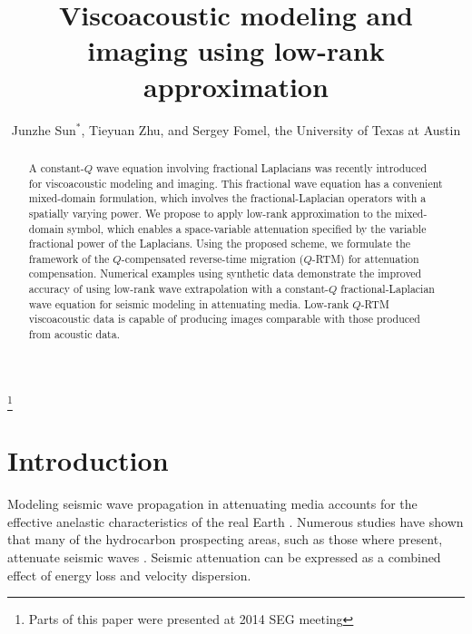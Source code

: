 \title{Viscoacoustic modeling and imaging using low-rank approximation}
\author{Junzhe Sun$^{*}$, Tieyuan Zhu, and Sergey Fomel, the University of Texas at Austin}
\maketitle

\address{
\footnotemark[1]Bureau of Economic Geology \\
John A. and Katherine G. Jackson School of Geosciences \\
The University of Texas at Austin \\
University Station, Box X \\
Austin, TX 78713-8924 \\
}

\footnote{Parts of this paper were presented at 2014 SEG meeting}


\begin{abstract}
A constant-$Q$ wave equation involving fractional Laplacians was recently introduced for viscoacoustic modeling and imaging. This fractional wave equation has a convenient mixed-domain formulation, which involves the fractional-Laplacian operators with a spatially varying power. We propose to apply low-rank approximation to the mixed-domain symbol, which enables a space-variable attenuation specified by the variable fractional power of the Laplacians. Using the proposed scheme, we formulate the framework of the $Q$-compensated reverse-time migration ($Q$-RTM) for attenuation compensation. Numerical examples using synthetic data demonstrate the improved accuracy of using low-rank wave extrapolation with a constant-$Q$ fractional-Laplacian wave equation for seismic modeling in attenuating media. Low-rank $Q$-RTM  viscoacoustic data is capable of producing images comparable  with those produced from acoustic data.
\end{abstract}

\section{Introduction}
Modeling seismic wave propagation in attenuating media accounts for the effective anelastic characteristics of the real Earth \cite[]{carc07}. Numerous studies have shown that many of the hydrocarbon prospecting areas, such as those where  present,  attenuate seismic waves \cite[]{dvorkin06}. Seismic attenuation can be expressed as a combined effect of energy loss and velocity dispersion. 

